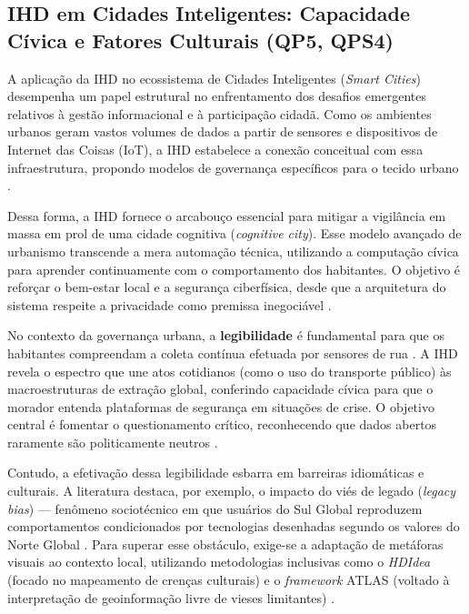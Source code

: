 \documentclass[12pt]{article}
\begin{document}
    \subsection{IHD em Cidades Inteligentes: Capacidade Cívica e Fatores Culturais (QP5, QPS4)}

A aplicação da IHD no ecossistema de Cidades Inteligentes (\textit{Smart Cities}) desempenha um papel estrutural no enfrentamento dos desafios emergentes relativos à gestão informacional e à participação cidadã. Como os ambientes urbanos geram vastos volumes de dados a partir de sensores e dispositivos de Internet das Coisas (IoT), a IHD estabelece a conexão conceitual com essa infraestrutura, propondo modelos de governança específicos para o tecido urbano \cite{coleti2024grandihc, capeleti2023heuristic, Kurze2023, Crabtree, Capeleti2024Human, Strey2019Human}.

Dessa forma, a IHD fornece o arcabouço essencial para mitigar a vigilância em massa em prol de uma cidade cognitiva (\textit{cognitive city}). Esse modelo avançado de urbanismo transcende a mera automação técnica, utilizando a computação cívica para aprender continuamente com o comportamento dos habitantes. O objetivo é reforçar o bem-estar local e a segurança ciberfísica, desde que a arquitetura do sistema respeite a privacidade como premissa inegociável \cite{kaufmann2021ethical, Konomi2022, Koesten2020}.

No contexto da governança urbana, a \textbf{legibilidade} é fundamental para que os habitantes compreendam a coleta contínua efetuada por sensores de rua \cite{Coleti2019DesigPatterns, Hutton2017}. A IHD revela o espectro que une atos cotidianos (como o uso do transporte público) às macroestruturas de extração global, conferindo capacidade cívica para que o morador entenda plataformas de segurança em situações de crise. O objetivo central é fomentar o questionamento crítico, reconhecendo que dados abertos raramente são politicamente neutros \cite{Capeleti2024Human, barcellos2022towards, Belizario2023Interacao, Hornung2015, Pereira, Cabitza2020131, JoseViterbo2020, Lindley2020, Bartram2022}.

Contudo, a efetivação dessa legibilidade esbarra em barreiras idiomáticas e culturais. A literatura destaca, por exemplo, o impacto do viés de legado (\textit{legacy bias}) — fenômeno sociotécnico em que usuários do Sul Global reproduzem comportamentos condicionados por tecnologias desenhadas segundo os valores do Norte Global \cite{Barreto2018, DeKreij2024, Friedman2024}. Para superar esse obstáculo, exige-se a adaptação de metáforas visuais ao contexto local, utilizando metodologias inclusivas como o \textit{HDIdea} (focado no mapeamento de crenças culturais) e o \textit{framework} ATLAS (voltado à interpretação de geoinformação livre de vieses limitantes) \cite{Alhakamy2021, Haghighati2020, Koesten2021, Coleti2020TR}.
\end{document}
